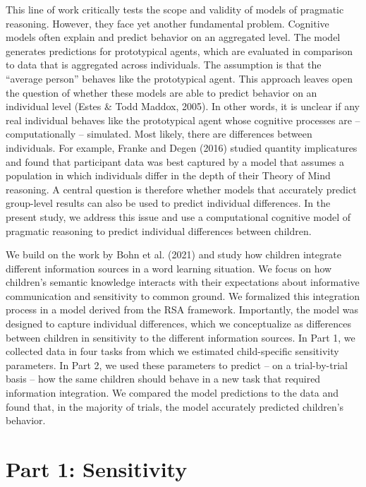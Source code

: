 \documentclass[
  man,floatsintext]{apa6}
\begin{document}
This line of work critically tests the scope and validity of models of pragmatic reasoning. However, they face yet another fundamental problem. Cognitive models often explain and predict behavior on an aggregated level. The model generates predictions for prototypical agents, which are evaluated in comparison to data that is aggregated across individuals. The assumption is that the ``average person'' behaves like the prototypical agent. This approach leaves open the question of whether these models are able to predict behavior on an individual level (Estes \& Todd Maddox, 2005). In other words, it is unclear if any real individual behaves like the prototypical agent whose cognitive processes are -- computationally -- simulated. Most likely, there are differences between individuals. For example, Franke and Degen (2016) studied quantity implicatures and found that participant data was best captured by a model that assumes a population in which individuals differ in the depth of their Theory of Mind reasoning. A central question is therefore whether models that accurately predict group-level results can also be used to predict individual differences. In the present study, we address this issue and use a computational cognitive model of pragmatic reasoning to predict individual differences between children.

We build on the work by Bohn et al. (2021) and study how children integrate different information sources in a word learning situation. We focus on how children's semantic knowledge interacts with their expectations about informative communication and sensitivity to common ground. We formalized this integration process in a model derived from the RSA framework. Importantly, the model was designed to capture individual differences, which we conceptualize as differences between children in sensitivity to the different information sources. In Part 1, we collected data in four tasks from which we estimated child-specific sensitivity parameters. In Part 2, we used these parameters to predict -- on a trial-by-trial basis -- how the same children should behave in a new task that required information integration. We compared the model predictions to the data and found that, in the majority of trials, the model accurately predicted children's behavior.

\hypertarget{part-1-sensitivity}{%
\section{Part 1: Sensitivity}\label{part-1-sensitivity}}
\end{document}
